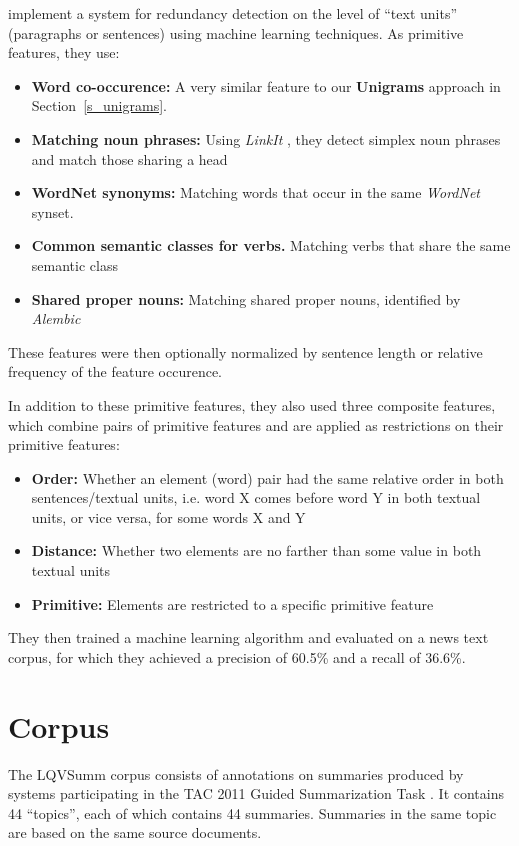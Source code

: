 \documentclass[a4paper,10pt]{scrartcl}
\theoremstyle{style}
\begin{document}
\cite{hatzivassiloglou1999detecting} implement a system for redundancy detection on the level of ``text units'' (paragraphs or sentences) using machine learning techniques. As primitive features, they use:

\begin{itemize}
	\item \textbf{Word co-occurence:} A very similar feature to our \textbf{Unigrams} approach in Section~\ref{s_unigrams}.
	\item \textbf{Matching noun phrases:} Using \textit{LinkIt} \citep{wacholder1998simplex}, they detect simplex noun phrases and match those sharing a head
	\item \textbf{WordNet synonyms:} Matching words that occur in the same \textit{WordNet} \citep{fellbaum2005wordnet} synset.
	\item \textbf{Common semantic classes for verbs.} Matching verbs that share the same semantic class \citep{levin1993english}
	\item \textbf{Shared proper nouns:} Matching shared proper nouns, identified by \textit{Alembic} \citep{aberdeen1995mitre}
\end{itemize}

These features were then optionally normalized by sentence length or relative frequency of the feature occurence.

In addition to these primitive features, they also used three composite features, which combine pairs of primitive features and are applied as restrictions on their primitive features:

\begin{itemize}
	\item \textbf{Order:} Whether an element (word) pair had the same relative order in both sentences/textual units, i.e. word X comes before word Y in both textual units, or vice versa, for some words X and Y
	\item \textbf{Distance:} Whether two elements are no farther than some value in both textual units
	\item \textbf{Primitive:} Elements are restricted to a specific primitive feature
\end{itemize}

They then trained a machine learning algorithm \citep{cohen1996learning} and evaluated on a news text corpus, for which they achieved a precision of 60.5\% and a recall of 36.6\%.

\newpage
\section{Corpus}
\label{corpus_study}
The LQVSumm corpus consists of annotations on summaries produced by systems participating in the TAC 2011 Guided Summarization Task \citep{owczarzak2011overview}. It contains 44 ``topics'', each of which contains 44 summaries.
Summaries in the same topic are based on the same source documents.
\end{document}

